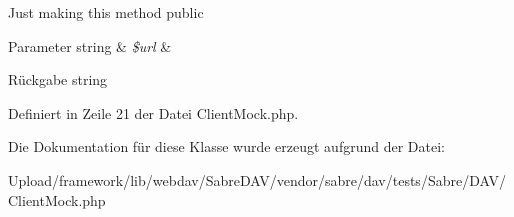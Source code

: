 Just making this method public


\begin{DoxyParams}[1]{Parameter}
string & {\em \$url} & \\
\hline
\end{DoxyParams}
\begin{DoxyReturn}{Rückgabe}
string 
\end{DoxyReturn}


Definiert in Zeile 21 der Datei Client\+Mock.\+php.



Die Dokumentation für diese Klasse wurde erzeugt aufgrund der Datei\+:\begin{DoxyCompactItemize}
\item 
Upload/framework/lib/webdav/\+Sabre\+D\+A\+V/vendor/sabre/dav/tests/\+Sabre/\+D\+A\+V/Client\+Mock.\+php\end{DoxyCompactItemize}
